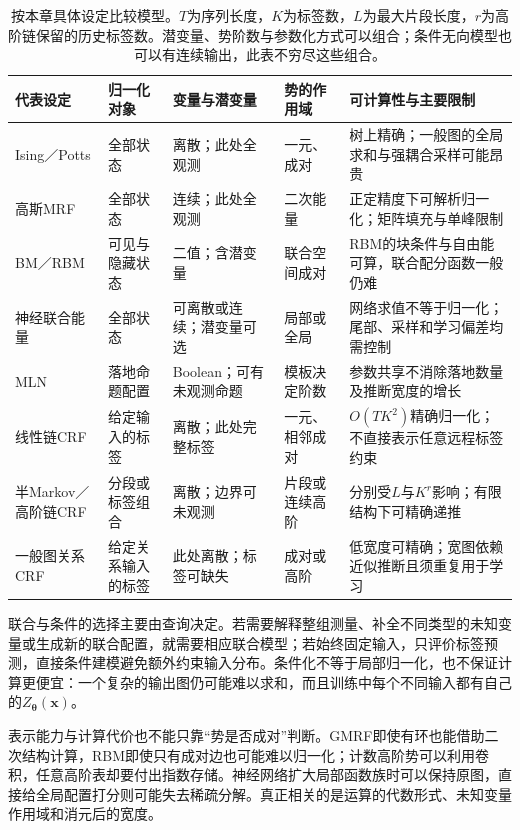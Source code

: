 \begin{table}[htbp]
  \centering
  \small
  \begin{tabularx}{\linewidth}{p{27mm}p{19mm}p{24mm}p{24mm}X}
    \toprule
    代表设定 & 归一化对象 & 变量与潜变量 & 势的作用域 & 可计算性与主要限制\\
    \midrule
    Ising／Potts & 全部状态 & 离散；此处全观测 & 一元、成对 & 树上精确；一般图的全局求和与强耦合采样可能昂贵\\
    高斯MRF & 全部状态 & 连续；此处全观测 & 二次能量 & 正定精度下可解析归一化；矩阵填充与单峰限制\\
    BM／RBM & 可见与隐藏状态 & 二值；含潜变量 & 联合空间成对 & RBM的块条件与自由能可算，联合配分函数一般仍难\\
    神经联合能量 & 全部状态 & 可离散或连续；潜变量可选 & 局部或全局 & 网络求值不等于归一化；尾部、采样和学习偏差均需控制\\
    MLN & 落地命题配置 & Boolean；可有未观测命题 & 模板决定阶数 & 参数共享不消除落地数量及推断宽度的增长\\
    线性链CRF & 给定输入的标签 & 离散；此处完整标签 & 一元、相邻成对 & $O(TK^2)$精确归一化；不直接表示任意远程标签约束\\
    半Markov／高阶链CRF & 分段或标签组合 & 离散；边界可未观测 & 片段或连续高阶 & 分别受$L$与$K^r$影响；有限结构下可精确递推\\
    一般图关系CRF & 给定关系输入的标签 & 此处离散；标签可缺失 & 成对或高阶 & 低宽度可精确；宽图依赖近似推断且须重复用于学习\\
    \bottomrule
  \end{tabularx}
  \caption{按本章具体设定比较模型。$T$为序列长度，$K$为标签数，$L$为最大片段长度，$r$为高阶链保留的历史标签数。潜变量、势阶数与参数化方式可以组合；条件无向模型也可以有连续输出，此表不穷尽这些组合。}
  \label{tab:pgm-energy-models-comparison}
\end{table}

联合与条件的选择主要由查询决定。若需要解释整组测量、补全不同类型的未知变量或生成新的联合配置，就需要相应联合模型；若始终固定输入，只评价标签预测，直接条件建模避免额外约束输入分布。条件化不等于局部归一化，也不保证计算更便宜：一个复杂的输出图仍可能难以求和，而且训练中每个不同输入都有自己的$Z_{\bm{\theta}}(\bm{x})$。

表示能力与计算代价也不能只靠“势是否成对”判断。GMRF即使有环也能借助二次结构计算，RBM即使只有成对边也可能难以归一化；计数高阶势可以利用卷积，任意高阶表却要付出指数存储。神经网络扩大局部函数族时可以保持原图，直接给全局配置打分则可能失去稀疏分解。真正相关的是运算的代数形式、未知变量作用域和消元后的宽度。


